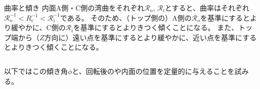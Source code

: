 \begin{Column}{曲率と傾き}
内面A側・C側の湾曲をそれぞれ$\mathcal R_\mathrm o$, $\mathcal R_\mathrm i$とすると、曲率はそれぞれ$\mathcal R_\mathrm o^{-1} < R_\mathrm c^{-1} < \mathcal R_\mathrm i^{-1}$である。
そのため、（トップ側の）A側の$\mathcal R_\mathrm o$を基準にするとより緩やかに、C側の$\mathcal R_\mathrm i$を基準にするとよりきつく傾くことになる。
また、トップ端から（$Z$方向に）遠い点を基準にするとより緩やかに、近い点を基準にするとよりきつく傾くことになる。
\end{Column}

以下ではこの傾き角$\phi$と、回転後の\Dimple や内面の位置を定量的に与えることを試みる。



